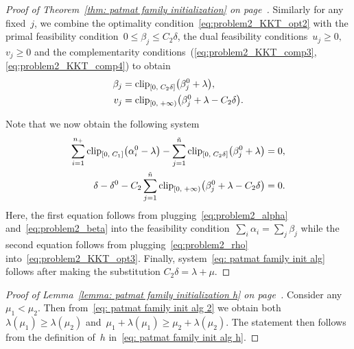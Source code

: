 \begin{proof}[Proof of Theorem~\ref{thm: patmat family initialization} on page~\pageref{thm: patmat family initialization}]
  Similarly for any fixed~$j$, we combine the optimality condition~\eqref{eq:problem2_KKT_opt2} with the primal feasibility condition~$0 \le \beta_j \le C_2 \delta$, the dual feasibility conditions~$u_j \ge 0,$ $v_j \ge 0$ and the complementarity conditions~(\ref{eq:problem2_KKT_comp3}, \ref{eq:problem2_KKT_comp4}) to obtain
  \begin{align}
    \beta_j & = \clip{0}{C_2 \delta}{\beta_j^0 + \lambda}, \label{eq:problem2_beta} \\
    v_j & = \clip[u]{0}{+\infty}{\beta_j^0 + \lambda - C_2 \delta}. \label{eq:problem2_rho}
  \end{align}

  Note that we now obtain the following system
  \begin{align*}
    \sum_{i=1}^{\npos} \clip{0}{C_1}{\alpha_i^0 - \lambda} - \sum_{j = 1}^{\ntil} \clip{0}{C_2 \delta}{\beta_j^0 + \lambda}
      & = 0, \\
    \delta - \delta^0 - C_2 \sum_{j = 1}^{\ntil} \clip[u]{0}{+\infty}{\beta_j^0 + \lambda - C_2 \delta}
      & = 0.
  \end{align*}
  Here, the first equation follows from plugging~\eqref{eq:problem2_alpha} and~\eqref{eq:problem2_beta} into the feasibility condition~$\sum_i \alpha_i =\sum_j \beta_j$ while the second equation follows from plugging~\eqref{eq:problem2_rho} into~\eqref{eq:problem2_KKT_opt3}. Finally, system~\eqref{eq: patmat family init alg} follows after making the substitution $C_2 \delta = \lambda + \mu$.
\end{proof}

\patinith*
\begin{proof}[Proof of Lemma~\ref{lemma: patmat family initialization h} on page~\pageref{lemma: patmat family initialization h}]
  Consider any~$\mu_1 < \mu_2$. Then from~\eqref{eq: patmat family init alg 2} we obtain both~$\lambda(\mu_1) \ge \lambda(\mu_2)$ and~$\mu_1+\lambda(\mu_1) \ge \mu_2 + \lambda(\mu_2)$. The statement then follows from the definition of~$h$ in~\eqref{eq: patmat family init alg h}.
\end{proof}
